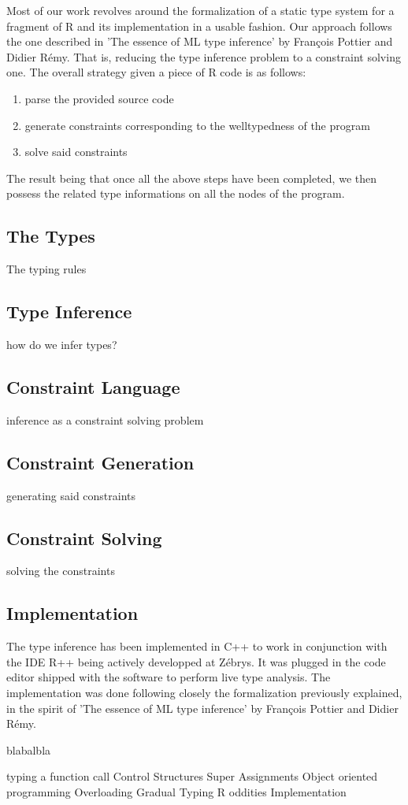 Most of our work revolves around the formalization of a static type system for a fragment of R and its implementation in a usable fashion. Our approach follows the one described in 'The essence of ML type inference' by Fran\c cois Pottier and Didier R\'emy. That is, reducing the type inference problem to a constraint solving one. The overall strategy given a piece of R code is as follows:
\begin{enumerate}
\item[] parse the provided source code
\item[] generate constraints corresponding to the welltypedness of the program
\item[] solve said constraints
\end{enumerate}

The result being that once all the above steps have been completed, we then possess the related type informations on all the nodes of the program.

\subsection{The Types}

The typing rules

\subsection{Type Inference}

how do we infer types?

\subsection{Constraint Language}

inference as a constraint solving problem

\subsection{Constraint Generation}

generating said constraints

\subsection{Constraint Solving}

solving the constraints

\subsection{Implementation}


The type inference has been implemented in C++ to work in conjunction with the IDE R++ being actively developped at Z\'ebrys. It was plugged in the code editor shipped with the software to perform live type analysis. The implementation was done following closely the formalization previously explained, in the spirit of 'The essence of ML type inference' by Fran\c cois Pottier and Didier R\'emy.

blabalbla

typing a function call
Control Structures
Super Assignments
Object oriented programming
Overloading
Gradual Typing
R oddities
Implementation
